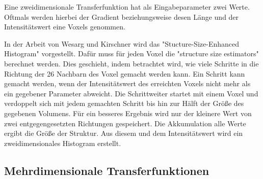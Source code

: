 Eine zweidimensionale Transferfunktion hat als Eingabeparameter zwei Werte. Oftmals werden hierbei der Gradient beziehungsweise desen Länge und der Intensitätswert eine Voxels genommen.


In der Arbeit von Wesarg und Kirschner \cite{wesarg2009structure, wesarg20102d} wird das "Stucture-Size-Enhanced Histogram" vorgestellt.
\newline
Dafür muss für jeden Voxel die "structure size estimators" berechnet werden. Dies geschieht, indem betrachtet wird, wie viele Schritte in die Richtung der 26 Nachbarn des Voxel gemacht werden kann. Ein Schritt kann gemacht werden, wenn der Intensitätswert des erreichten Voxels nicht mehr als ein gegebener Parameter abweicht. Die Schrittweiter startet mit einem Voxel und verdoppelt sich mit jedem gemachten Schritt bis hin zur Hälft der Größe des gegebenen Volumens. Für ein besseres Ergebnis wird nur der kleinere Wert von zwei entgegengesetzten Richtungen gespeichert. Die Akkumulation alle Werte ergibt die Größe der Struktur. Aus diesem und dem Intensitätswert wird ein zweidimensionales Histogram erstellt.





\subsection{Mehrdimensionale Transferfunktionen}




